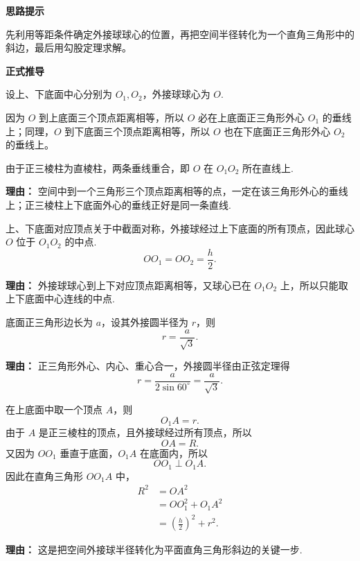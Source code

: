 \begin{proofbox}
	\textbf{\textcolor{CProof}{思路提示}}

	先利用等距条件确定外接球球心的位置，再把空间半径转化为一个直角三角形中的斜边，最后用勾股定理求解。

	\medskip
	\textbf{\textcolor{CProof}{正式推导}}
	\begin{description}[style=nextline, leftmargin=2.8em, labelsep=0.5em, itemsep=0.55em]
		\item[\textbf{步骤一（确定球心所在直线）：}] 设上、下底面中心分别为 $O_1,O_2$，外接球球心为 $O$.

		      因为 $O$ 到上底面三个顶点距离相等，所以 $O$ 必在上底面正三角形外心 $O_1$ 的垂线上；同理，$O$ 到下底面三个顶点距离相等，所以 $O$ 也在下底面正三角形外心 $O_2$ 的垂线上。

		      由于正三棱柱为直棱柱，两条垂线重合，即 $O$ 在 $O_1O_2$ 所在直线上.

		      \par\textbf{理由：} 空间中到一个三角形三个顶点距离相等的点，一定在该三角形外心的垂线上；正三棱柱上下底面外心的垂线正好是同一条直线.

		\item[\textbf{步骤二（确定球心为中点）：}] 上、下底面对应顶点关于中截面对称，外接球经过上下底面的所有顶点，因此球心 $O$ 位于 $O_1O_2$ 的中点.
		      \[
			      OO_1=OO_2=\frac h2.
		      \]
		      \par\textbf{理由：} 外接球球心到上下对应顶点距离相等，又球心已在 $O_1O_2$ 上，所以只能取上下底面中心连线的中点.

		\item[\textbf{步骤三（底面外接圆半径）：}] 底面正三角形边长为 $a$，设其外接圆半径为 $r$，则
		      \[
			      r = \frac{a}{\sqrt{3}}.
		      \]
		      \par\textbf{理由：} 正三角形外心、内心、重心合一，外接圆半径由正弦定理得
		      \[
			      r=\frac{a}{2\sin 60^{\circ}}=\frac{a}{\sqrt3}.
		      \]

		\item[\textbf{步骤四（构造直角三角形）：}] 在上底面中取一个顶点 $A$，则
		      \[
			      O_1A=r.
		      \]
		      由于 $A$ 是正三棱柱的顶点，且外接球经过所有顶点，所以
		      \[
			      OA=R.
		      \]
		      又因为 $OO_1$ 垂直于底面，$O_1A$ 在底面内，所以
		      \[
			      OO_1\perp O_1A.
		      \]
		      因此在直角三角形 $OO_1A$ 中，
		      \[
			      \begin{aligned}
				      R^{2}
				       & =OA^{2}                           \\
				       & =OO_1^{2}+O_1A^{2}                \\
				       & =\left(\frac h2\right)^{2}+r^{2}.
			      \end{aligned}
		      \]
		      \par\textbf{理由：} 这是把空间外接球半径转化为平面直角三角形斜边的关键一步.


\end{description}
\end{proofbox}
